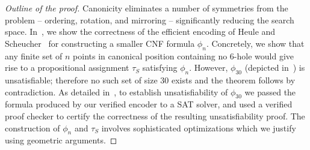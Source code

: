 \begin{proof}[Outline of the proof]
Canonicity eliminates a number of symmetries from the problem --
ordering, rotation, and mirroring --
significantly reducing the search space.
In~, we show the correctness of the efficient encoding of Heule and Scheucher~\cite{emptyHexagonNumber} for constructing
a smaller CNF formula $\phi_n$.
Concretely, we show that any finite set of $n$ points in canonical position
containing no $6$-hole
would give rise to a propositional assignment $\tau_S$ satisfying $\phi_n$.
However, $\phi_{30}$ (depicted in~) is unsatisfiable;
therefore no such set of size $30$ exists
and the theorem follows by contradiction.
As detailed in~,
to establish unsatisfiability of $\phi_{30}$
we passed the formula produced by our verified encoder to a SAT solver,
and used a verified proof checker to certify the correctness of
the resulting unsatisfiability proof.
The construction of $\phi_n$ and $\tau_S$
involves sophisticated optimizations
which we justify using geometric arguments.
\end{proof}



